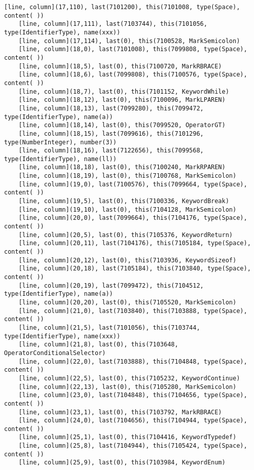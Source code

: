 \documentclass[UTF8]{ctexart}
\begin{document}
{\begin{lstlisting}[language={[ANSI]C++}]
    [line, column](17,110), last(7101200), this(7101008, type(Space), content( ))
    [line, column](17,111), last(7103744), this(7101056, type(IdentifierType), name(xxx))
    [line, column](17,114), last(0), this(7100528, MarkSemicolon)
    [line, column](18,0), last(7101008), this(7099808, type(Space), content( ))
    [line, column](18,5), last(0), this(7100720, MarkRBRACE)
    [line, column](18,6), last(7099808), this(7100576, type(Space), content( ))
    [line, column](18,7), last(0), this(7101152, KeywordWhile)
    [line, column](18,12), last(0), this(7100096, MarkLPAREN)
    [line, column](18,13), last(7099280), this(7099472, type(IdentifierType), name(a))
    [line, column](18,14), last(0), this(7099520, OperatorGT)
    [line, column](18,15), last(7099616), this(7101296, type(NumberInteger), number(3))
    [line, column](18,16), last(7122656), this(7099568, type(IdentifierType), name(ll))
    [line, column](18,18), last(0), this(7100240, MarkRPAREN)
    [line, column](18,19), last(0), this(7100768, MarkSemicolon)
    [line, column](19,0), last(7100576), this(7099664, type(Space), content( ))
    [line, column](19,5), last(0), this(7100336, KeywordBreak)
    [line, column](19,10), last(0), this(7104128, MarkSemicolon)
    [line, column](20,0), last(7099664), this(7104176, type(Space), content( ))
    [line, column](20,5), last(0), this(7105376, KeywordReturn)
    [line, column](20,11), last(7104176), this(7105184, type(Space), content( ))
    [line, column](20,12), last(0), this(7103936, KeywordSizeof)
    [line, column](20,18), last(7105184), this(7103840, type(Space), content( ))
    [line, column](20,19), last(7099472), this(7104512, type(IdentifierType), name(a))
    [line, column](20,20), last(0), this(7105520, MarkSemicolon)
    [line, column](21,0), last(7103840), this(7103888, type(Space), content( ))
    [line, column](21,5), last(7101056), this(7103744, type(IdentifierType), name(xxx))
    [line, column](21,8), last(0), this(7103648, OperatorConditionalSelector)
    [line, column](22,0), last(7103888), this(7104848, type(Space), content( ))
    [line, column](22,5), last(0), this(7105232, KeywordContinue)
    [line, column](22,13), last(0), this(7105280, MarkSemicolon)
    [line, column](23,0), last(7104848), this(7104656, type(Space), content( ))
    [line, column](23,1), last(0), this(7103792, MarkRBRACE)
    [line, column](24,0), last(7104656), this(7104944, type(Space), content( ))
    [line, column](25,1), last(0), this(7104416, KeywordTypedef)
    [line, column](25,8), last(7104944), this(7105424, type(Space), content( ))
    [line, column](25,9), last(0), this(7103984, KeywordEnum)

\end{lstlisting}}
\end{document}
